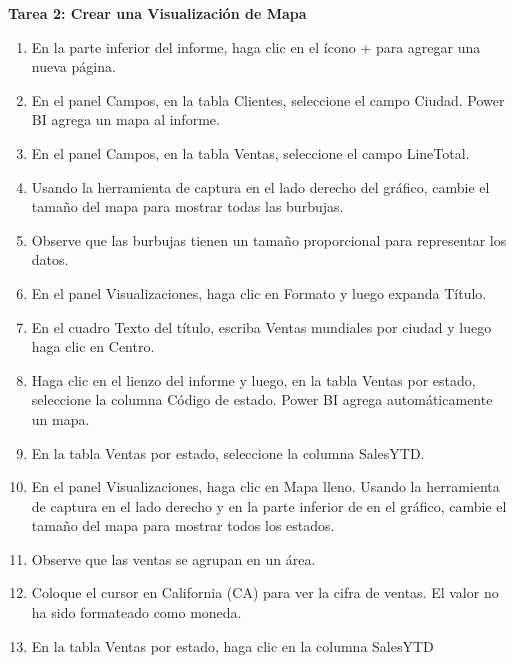 \begin{itemize}
\textbf{Tarea 2: Crear una Visualización de Mapa}
\end{itemize}


\begin{enumerate}

	\item En la parte inferior del informe, haga clic en el ícono + para agregar una nueva página.

    \item En el panel Campos, en la tabla Clientes, seleccione el campo Ciudad. Power BI agrega un mapa al informe.

    \item En el panel Campos, en la tabla Ventas, seleccione el campo LineTotal.
    \item Usando la herramienta de captura en el lado derecho del gráfico, cambie el tamaño del mapa para mostrar todas las burbujas.

    \item Observe que las burbujas tienen un tamaño proporcional para representar los datos.

    \item En el panel Visualizaciones, haga clic en Formato y luego expanda Título.
    
    
    	\item En el cuadro Texto del título, escriba Ventas mundiales por ciudad y luego haga clic en Centro.

    \item Haga clic en el lienzo del informe y luego, en la tabla Ventas por estado, seleccione la columna Código de estado. Power BI agrega automáticamente un mapa.

    \item En la tabla Ventas por estado, seleccione la columna SalesYTD.
    \item En el panel Visualizaciones, haga clic en Mapa lleno. Usando la herramienta de captura en el lado derecho y en la parte inferior de en el gráfico, cambie el tamaño del mapa para mostrar todos los estados.

    \item Observe que las ventas se agrupan en un área.

    \item Coloque el cursor en California (CA) para ver la cifra de ventas. El valor no ha sido formateado como moneda.
    
    	\item En la tabla Ventas por estado, haga clic en la columna SalesYTD


\end{enumerate}
